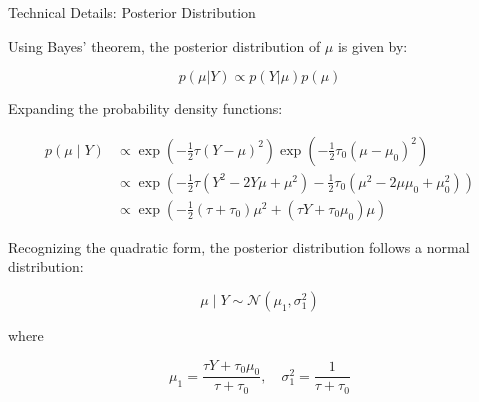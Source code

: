 \begin{frame}{Technical Details: Posterior Distribution}

Using Bayes' theorem, the posterior distribution of $ \mu $ is given by:

$$
p(\mu|Y) \propto p(Y|\mu) p(\mu)
$$

Expanding the probability density functions:

$$
\begin{align}
p(\mu \mid Y) &\propto \exp\left(-\frac{1}{2} \tau (Y - \mu)^2\right) \exp\left(-\frac{1}{2} \tau_0 (\mu - \mu_0)^2\right) \\
&\propto \exp\left(-\frac{1}{2} \tau (Y^2 - 2Y\mu + \mu^2) - \frac{1}{2} \tau_0 (\mu^2 - 2\mu \mu_0 + \mu_0^2)\right) \\
&\propto \exp\left(-\frac{1}{2} (\tau + \tau_0) \mu^2 + (\tau Y + \tau_0 \mu_0) \mu \right)
\end{align}
$$

Recognizing the quadratic form, the posterior distribution follows a normal distribution:

$$
\mu \mid Y \sim \mathcal{N}\left( \mu_1, \sigma_1^2 \right)
$$

where

$$
\mu_1 = \frac{\tau Y + \tau_0 \mu_0}{\tau + \tau_0}, \quad \sigma_1^2 = \frac{1}{\tau + \tau_0}
$$

\end{frame}

